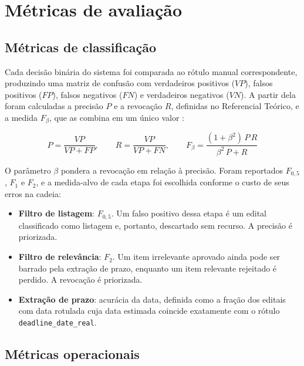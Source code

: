 \section{Métricas de avaliação}
\label{sec:metricas}

\subsection{Métricas de classificação}
\label{subsec:classificacao}

Cada decisão binária do sistema foi comparada ao rótulo manual correspondente,
produzindo uma matriz de confusão com verdadeiros positivos ($VP$), falsos
positivos ($FP$), falsos negativos ($FN$) e verdadeiros negativos ($VN$). A
partir dela foram calculadas a precisão $P$ e a revocação $R$, definidas no
Referencial Teórico, e a medida $F_\beta$, que as combina em um único valor
\cite{vanrijsbergen1979,manning2008,sokolova2009}:

\begin{equation}
\label{eq:fbeta}
P = \frac{VP}{VP + FP},
\qquad
R = \frac{VP}{VP + FN},
\qquad
F_{\beta} = \frac{(1 + \beta^{2})\, P\, R}{\beta^{2}\, P + R}
\end{equation}

O parâmetro $\beta$ pondera a revocação em relação à precisão. Foram reportados
$F_{0{,}5}$, $F_1$ e $F_2$, e a medida-alvo de cada etapa foi escolhida conforme
o custo de seus erros na cadeia:

\begin{itemize}
  \item \textbf{Filtro de listagem}: $F_{0{,}5}$. Um falso positivo dessa etapa é
    um edital classificado como listagem e, portanto, descartado sem recurso. A
    precisão é priorizada.
  \item \textbf{Filtro de relevância}: $F_2$. Um item irrelevante aprovado
    ainda pode ser barrado pela extração de prazo, enquanto um item relevante
    rejeitado é perdido. A revocação é priorizada.
  \item \textbf{Extração de prazo}: acurácia da data, definida como a fração
    dos editais com data rotulada cuja data estimada coincide exatamente com o
    rótulo \texttt{deadline\_date\_real}.
\end{itemize}

\subsection{Métricas operacionais}
\label{subsec:operacionais}

